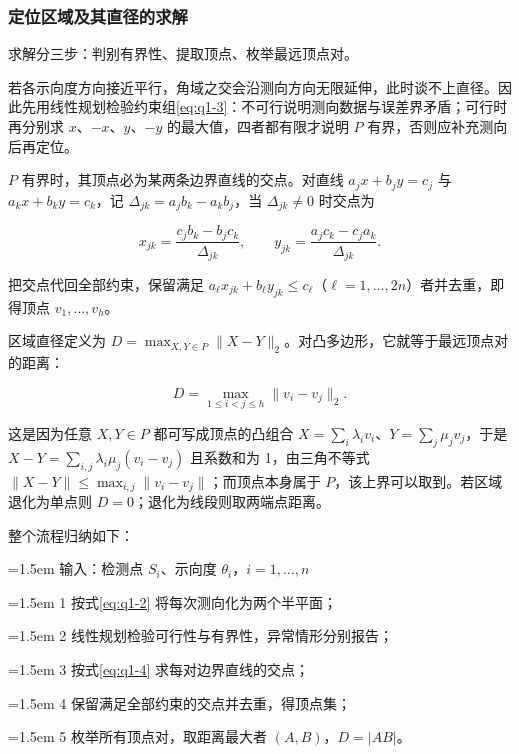 \subsubsection{定位区域及其直径的求解}\label{sec:q1-2}
求解分三步：判别有界性、提取顶点、枚举最远顶点对。

若各示向度方向接近平行，角域之交会沿测向方向无限延伸，此时谈不上直径。因此先用线性规划检验约束组\eqref{eq:q1-3}：不可行说明测向数据与误差界矛盾；可行时再分别求 $x$、$-x$、$y$、$-y$ 的最大值，四者都有限才说明 $P$ 有界，否则应补充测向后再定位。

$P$ 有界时，其顶点必为某两条边界直线的交点。对直线 $a_jx+b_jy=c_j$ 与 $a_kx+b_ky=c_k$，记 $\Delta_{jk}=a_jb_k-a_kb_j$，当 $\Delta_{jk}\ne 0$ 时交点为

\begin{equation}\label{eq:q1-4}
x_{jk}=\frac{c_jb_k-b_jc_k}{\Delta_{jk}},\qquad
y_{jk}=\frac{a_jc_k-c_ja_k}{\Delta_{jk}}.
\end{equation}

把交点代回全部约束，保留满足 $a_\ell x_{jk}+b_\ell y_{jk}\le c_\ell$（$\ell=1,\dots,2n$）者并去重，即得顶点 $v_1,\dots,v_h$。

区域直径定义为 $D=\max_{X,Y\in P}\|X-Y\|_2$。对凸多边形，它就等于最远顶点对的距离：

\begin{equation}\label{eq:q1-5}
D=\max_{1\le i<j\le h}\|v_i-v_j\|_2 .
\end{equation}

这是因为任意 $X,Y\in P$ 都可写成顶点的凸组合 $X=\sum_i\lambda_iv_i$、$Y=\sum_j\mu_jv_j$，于是 $X-Y=\sum_{i,j}\lambda_i\mu_j(v_i-v_j)$ 且系数和为 1，由三角不等式 $\|X-Y\|\le\max_{i,j}\|v_i-v_j\|$；而顶点本身属于 $P$，该上界可以取到。若区域退化为单点则 $D=0$；退化为线段则取两端点距离。

整个流程归纳如下：

\begin{tcolorbox}[colback=black!2,colframe=black!22,boxrule=0.4pt,arc=0pt,left=9pt,right=9pt,top=7pt,bottom=7pt]
\small\setlength{\parskip}{2pt}
\noindent\hangindent=1.5em 输入：检测点 $S_i$、示向度 $\theta_i$，$i=1,\dots,n$\par
\noindent\hangindent=1.5em 1  按式\eqref{eq:q1-2} 将每次测向化为两个半平面；\par
\noindent\hangindent=1.5em 2  线性规划检验可行性与有界性，异常情形分别报告；\par
\noindent\hangindent=1.5em 3  按式\eqref{eq:q1-4} 求每对边界直线的交点；\par
\noindent\hangindent=1.5em 4  保留满足全部约束的交点并去重，得顶点集；\par
\noindent\hangindent=1.5em 5  枚举所有顶点对，取距离最大者 $(A,B)$，$D=|AB|$。\par
\end{tcolorbox}

